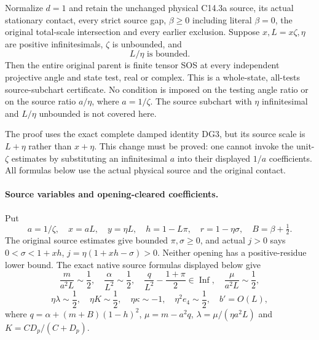 \label{component:pc720c1e06aca}

\label{pc720c1e06aca:sec:r17-large-zeta-damped}

\begin{theorem}
Normalize $d=1$ and retain the unchanged physical C14.3a source,
its actual stationary contact, every strict source gap,
$\beta\ge0$ including literal $\beta=0$, the original total-scale
intersection and every earlier exclusion. Suppose $x,L=x\zeta,\eta$
are positive infinitesimals, $\zeta$ is unbounded, and
\[
                         L/\eta\text{ is bounded}.       \tag{LD1}
\]
Then the entire original parent is finite tensor SOS at every independent
projective angle and state test, real or complex. This is a whole-state,
all-tests source-subchart certificate. No condition is imposed on the
testing angle ratio or on the source ratio $a/\eta$, where $a=1/\zeta$.
The source subchart with $\eta$ infinitesimal and $L/\eta$ unbounded
is not covered here.
\end{theorem}

The proof uses the exact complete damped identity DG3, but its source
scale is $L+\eta$ rather than $x+\eta$. This change must be proved:
one cannot invoke the unit-$\zeta$ estimates by substituting an
infinitesimal $a$ into their displayed $1/a$ coefficients. All formulas
below use the actual physical source and the original contact.

\paragraph{Source variables and opening-cleared coefficients.}
Put
\[
 a=1/\zeta,\quad x=aL,\quad y=\eta L,\quad
 h=1-L\pi,\quad r=1-\eta\sigma,\quad B=\beta+\tfrac12.
\]
The original source estimates give bounded $\pi,\sigma\ge0$, and
actual $j>0$ says
$0<\sigma<1+xh$, $j=\eta(1+xh-\sigma)>0$.
Neither opening has a positive-residue lower bound.
The exact native source formulas displayed below give
\[
 \frac{m}{a^2L}\sim\frac12,\quad
 \frac{\alpha}{L^2}\sim\frac12,\quad
 \frac{q}{L^2}-\frac{1+\pi}{2}\in\operatorname{Inf},\quad
 \frac{\mu}{a^2L}\sim\frac12,
\]
\[
 \eta\lambda\sim\frac12,\quad
 \eta K\sim\frac12,\quad
 \eta\kappa\sim-1,\quad \eta^2e_4\sim\frac12,
 \quad b'=O(L),                                     \tag{LD2}
\]
where $q=\alpha+(m+B)(1-h)^2$, $\mu=m-a^2q$,
$\lambda=\mu/(\eta a^2L)$ and $K=CD_p/(C+D_p)$.

